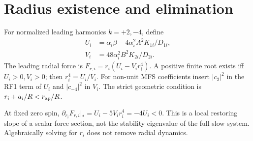 \section{Radius existence and elimination}
For normalized leading harmonics $k=+2,-4$, define
\begin{align}
U_i&=\alpha_i\beta-4\alpha_i^2A^2K_{1i}/D_{1i},\\
V_i&=48\alpha_i^2B^2K_{2i}/D_{2i}.
\end{align}
The leading radial force is $F_{r,i}=r_i(U_i-V_i r_i^4)$. A positive finite root exists iff $U_i>0,V_i>0$; then $r_i^4=U_i/V_i$. For non-unit MFS coefficients insert $|c_2|^2$ in the RF1 term of $U_i$ and $|c_{-4}|^2$ in $V_i$. The strict geometric condition is $r_i+a_i/R<r_{\rm ap}/R$.

At fixed zero spin, $\partial_{r_i}F_{r,i}|_*=U_i-5V_ir_i^4=-4U_i<0$. This is a local restoring slope of a scalar force section, not the stability eigenvalue of the full slow system. Algebraically solving for $r_i$ does not remove radial dynamics.
